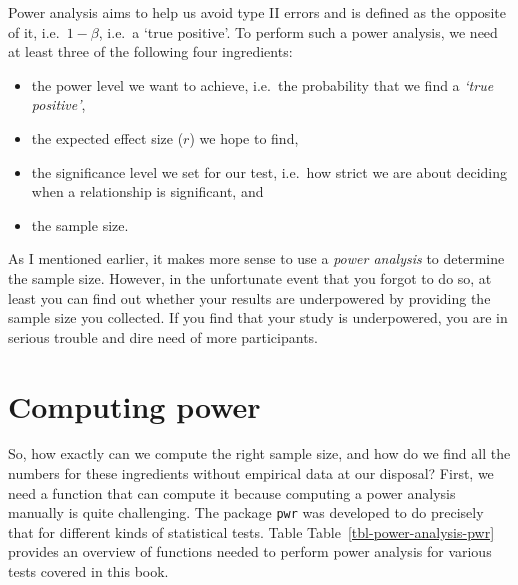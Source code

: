 \documentclass[
  letterpaper,
]{krantz}
\begin{document}
Power analysis aims to help us avoid type II errors and is defined as
the opposite of it, i.e.~\(1 - \beta\), i.e.~a `true positive'. To
perform such a power analysis, we need at least three of the following
four ingredients:

\begin{itemize}
\item
  the power level we want to achieve, i.e.~the probability that we find
  a \emph{`true positive'},
\item
  the expected effect size (\(r\)) we hope to find,
\item
  the significance level we set for our test, i.e.~how strict we are
  about deciding when a relationship is significant, and
\item
  the sample size.
\end{itemize}

As I mentioned earlier, it makes more sense to use a \emph{power
analysis} to determine the sample size. However, in the unfortunate
event that you forgot to do so, at least you can find out whether your
results are underpowered by providing the sample size you collected. If
you find that your study is underpowered, you are in serious trouble and
dire need of more participants.

\section{Computing power}\label{sec-computing-power}

So, how exactly can we compute the right sample size, and how do we find
all the numbers for these ingredients without empirical data at our
disposal? First, we need a function that can compute it because
computing a power analysis manually is quite challenging. The package
\texttt{pwr} was developed to do precisely that for different kinds of
statistical tests. Table Table~\ref{tbl-power-analysis-pwr} provides an
overview of functions needed to perform power analysis for various tests
covered in this book.
\end{document}
